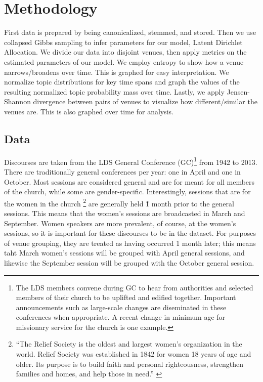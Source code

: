 \section {Methodology}
First data is prepared by being canonicalized, stemmed, and stored. Then we use collapsed Gibbs sampling to infer parameters for our model, Latent Dirichlet Allocation. We divide our data into disjoint venues, then apply metrics on the estimated parameters of our model. We employ entropy to show how a venue narrows/broadens over time. This is graphed for easy interpretation. We normalize topic distributions for key time spans and graph the values of the resulting normalized topic probability mass over time. Lastly, we apply Jensen-Shannon divergence between pairs of venues to visualize how different/similar the venues are. This is also graphed over time for analysis.

\subsection{Data}
Discourses are taken from the LDS %
General Conference (GC)\footnote{The LDS members convene during GC to hear from authorities and selected members of their church to be uplifted and edified together. Important announcements such as large-scale changes are diseminated in these conferences when appropriate. A recent change in minimum age for missionary service for the church is one example.} from 1942 to 2013. There are traditionally general conferences per year: one in April and one in October. Most sessions are considered general and are for meant for all members of the church, while some are gender-specific. Interestingly, sessions that are for the women in the church \footnote{``The Relief Society is the oldest and largest women's organization in the world. Relief Society was established in 1842 for women 18 years of age and older. Its purpose is to build faith and personal righteousness, strengthen families and homes, and help those in need.'' \cite{mormon.org-rs}} are generally held \~1 month prior to the general sessions. This means that the women's sessions are broadcasted in March and September. Women speakers are more prevalent, of course, at the women's sessions, so it is important for these discourses to be in the dataset. For purposes of venue grouping, they are treated as having occurred 1 month later; this means taht March women's sessions will be grouped with April general sessions, and likewise the September session will be grouped with the October general session. 

